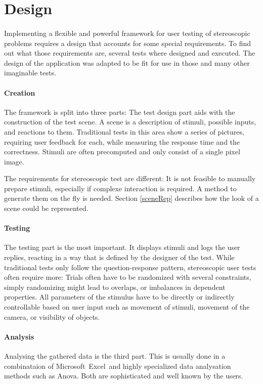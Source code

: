 \section{Design\label{Design}}
\paragraph{}
Implementing a flexible and powerful framework for user testing of stereoscopic problems requires a design that accounts for some special requirements. To find out what those requirements are, several tests where designed and executed. The design of the application was adapted to be fit for use in those and many other imaginable tests.

\paragraph{Creation}
The framework is split into three parts: The test design part aids with the construction of the test scene. A scene is a description of stimuli, possible inputs, and reactions to them. Traditional tests in this area show a series of pictures, requiring user feedback for each, while measuring the response time and the correctness. Stimuli are often precomputed and only consist of a single pixel image.

The requirements for stereoscopic test are different: It is not feasible to manually prepare stimuli, especially if complexe interaction is required. A method to generate them on the fly is needed.
Section \ref{sceneRep} describes how the look of a scene could be represented.

\paragraph{Testing}
The testing part is the most important. It displays stimuli and logs the user replies, reacting in a way that is defined by the designer of the test. While traditional tests only follow the question-response pattern, stereoscopic user tests often require more: Trials often have to be randomized with several constraints, simply randomizing might lead to overlaps, or imbalances in dependent properties. All parameters of the stimulus have to be directly or indirectly controllable based on user input such as movement of stimuli, movement of the camera, or visibility of objects.

\paragraph{Analysis}
Analysing the gathered data is the third part. This is usually done in a combinataion of Microsoft\texttrademark\ Excel\texttrademark\ and highly specialized data analysation methods such as Anova. Both are sophisticated and well known by the users.

